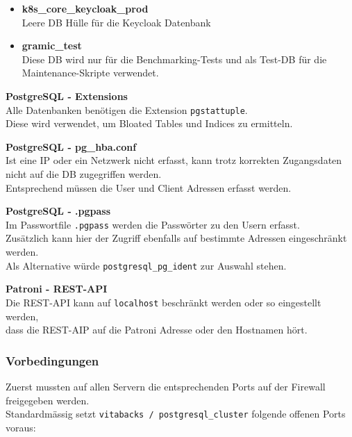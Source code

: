 \begin{flushleft}
\begin{description}
\begin{itemize}
            \item \textbf{k8s\_core\_keycloak\_prod}\hfill \\Leere DB Hülle für die \Gls{Keycloak} Datenbank
            \item \textbf{gramic\_test}\hfill \\Diese DB wird nur für die Benchmarking-Tests und als Test-DB für die Maintenance-Skripte verwendet.
        \end{itemize}
        \item \textbf{PostgreSQL - Extensions}\hfill \\Alle Datenbanken benötigen die Extension \texttt{pgstattuple}.\\Diese wird verwendet, um Bloated Tables und Indices zu ermitteln.
        \item \textbf{PostgreSQL - pg\_hba.conf}\hfill \\Ist eine IP oder ein Netzwerk nicht erfasst, kann trotz korrekten Zugangsdaten nicht auf die DB zugegriffen werden.\\Entsprechend müssen die User und Client Adressen erfasst werden.
        \item \textbf{PostgreSQL - .pgpass}\hfill \\Im Passwortfile \texttt{.pgpass} werden die Passwörter zu den Usern erfasst.\\Zusätzlich kann hier der Zugriff ebenfalls auf bestimmte Adressen eingeschränkt werden.\\Als Alternative würde \texttt{postgresql\_pg\_ident} zur Auswahl stehen.
        \item \textbf{Patroni - REST-API}\hfill \\Die REST-API kann auf \texttt{localhost} beschränkt werden oder so eingestellt werden,\\dass die REST-AIP auf die Patroni Adresse oder den Hostnamen hört.
    \end{description}
\end{flushleft}
\begin{flushleft}
    \subsubsection{Vorbedingungen}
    Zuerst mussten auf allen Servern die entsprechenden Ports auf der Firewall freigegeben werden.\\
    Standardmässig setzt \texttt{vitabacks / postgresql\_cluster} folgende offenen Ports voraus:
    
\end{flushleft}
